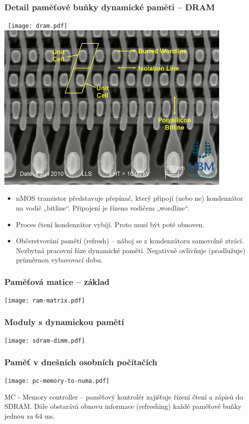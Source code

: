 \documentclass{beamer}
\begin{document}
\begin{frame}
\frametitle{Detail paměťové buňky dynamické paměti -- DRAM}

\hbox{
\texttt{[image: dram.pdf]}\hspace{0.1\linewidth}\includegraphics[width=0.4\linewidth]{fig/dram-cell.jpg}
}

\begin{itemize}
\item nMOS tranzistor představuje přepínač, který připojí (nebo ne) kondenzátor na vodič „bitline“. Připojení je řízeno vodičem „wordline“.
\item Proces čtení kondenzátor vybíjí. Proto musí být poté obnoven.
\item Občerstvování pamětí (refresh) – náboj se z kondenzátoru samovolně ztrácí. Nezbytná pracovní fáze dynamické paměti. Negativně ovlivňuje (prodlužuje) průměrnou vybavovací dobu.
\end{itemize}

\end{frame}

\begin{frame}
\frametitle{Paměťová matice -- základ}

\centering

\texttt{[image: ram-matrix.pdf]}

\end{frame}

\begin{frame}
\frametitle{Moduly s dynamickou pamětí}

\centering

\texttt{[image: sdram-dimm.pdf]}

\end{frame}

\begin{frame}
\frametitle{Paměť v dnešních osobních počítačích}

{
\centering

\texttt{[image: pc-memory-to-numa.pdf]}

}

\vskip 2mm

MC - Memory controller -- paměťový kontrolér zajišťuje řízení čtení a zápisů do SDRAM. Dále obstarává obnovu informace (refreshing) každé paměťové buňky jednou za 64 ms.

\end{frame}
\end{document}

